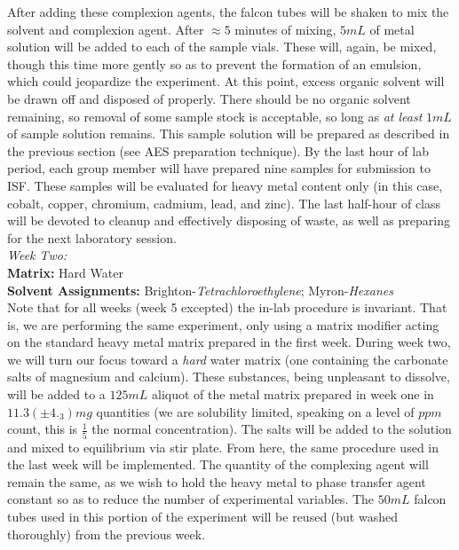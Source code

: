 \documentclass[letterpaper,12pt]{article}
\begin{document}
	\indent
	After adding these complexion agents, the falcon tubes will be shaken to mix the solvent and complexion agent. After $\approx5$ minutes of mixing, $5mL$ of metal solution will be added to each of the sample vials. These will, again, be mixed, though this time more gently so as to prevent the formation of an emulsion, which could jeopardize the experiment. At this point, excess organic solvent will be drawn off and disposed of properly. There should be no organic solvent remaining, so removal of some sample stock is acceptable, so long as \emph{at least} $1mL$ of sample solution remains. This sample solution will be prepared as described in the previous section (see AES preparation technique). By the last hour of lab period, each group member will have prepared nine samples for submission to ISF. These samples will be evaluated for heavy metal content only (in this case, cobalt, copper, chromium, cadmium, lead, and zinc). The last half-hour of class will be devoted to cleanup and effectively disposing of waste, as well as preparing for the next laboratory session.\\
	\Large\emph{Week Two:}
	\tiny 
	\normalsize \\
	\textbf{Matrix:} Hard Water\\
	\textbf{Solvent Assignments:} Brighton-\emph{Tetrachloroethylene}; Myron-\emph{Hexanes}\\
	\indent Note that for all weeks (week 5 excepted) the in-lab procedure is invariant. That is, we are performing the same experiment, only using a matrix modifier acting on the standard heavy metal matrix prepared in the first week. During week two, we will turn our focus toward a \emph{hard} water\cite{c4} matrix (one containing the carbonate salts of magnesium and calcium). These substances, being unpleasant to dissolve, will be added to a $125mL$ aliquot of the metal matrix prepared in week one in $11.3(\pm4._3)mg$ quantities (we are solubility limited, speaking on a level of $ppm$ count, this is $\frac{1}{5}$ the normal concentration). The salts will be added to the solution and mixed to equilibrium via stir plate. From here, the same procedure used in the last week will be implemented. The quantity of the complexing agent will remain the same, as we wish to hold the heavy metal to phase transfer agent constant so as to reduce the number of experimental variables. The $50mL$ falcon tubes used in this portion of the experiment will be reused (but washed thoroughly) from the previous week. \\
\end{document}
